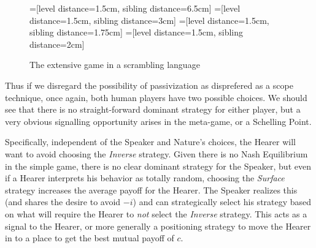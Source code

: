 \documentclass{article}
\begin{document}
\begin{figure}
\begin{center}
=[level distance=1.5cm, sibling distance=6.5cm]
=[level distance=1.5cm, sibling distance=3cm]
=[level distance=1.5cm, sibling distance=1.75cm]
=[level distance=1.5cm, sibling distance=2cm]
\end{center}
\caption{The extensive game\label{trees} in a scrambling language}
\end{figure}

Thus if we disregard the possibility of passivization as disprefered as a scope technique, once again, both human players have two possible choices.
We should see that there is no straight-forward dominant strategy for either player, but a very obvious signalling opportunity arises in the meta-game, or a Schelling Point.

Specifically, independent of the Speaker and Nature's choices, the Hearer will want to avoid choosing the \emph{Inverse} strategy.
Given there is no Nash Equilibrium in the simple game, there is no clear dominant strategy for the Speaker, but even if a Hearer interprets his behavior as totally random, choosing the \emph{Surface} strategy increases the average payoff for the Hearer.
The Speaker realizes this (and shares the desire to avoid $-i$) and can strategically select his strategy based on what will require the Hearer to \emph{not} select the \emph{Inverse} strategy.
This acts as a signal to the Hearer, or more generally a positioning strategy to move the Hearer in to a place to get the best mutual payoff of $c$.
\end{document}
